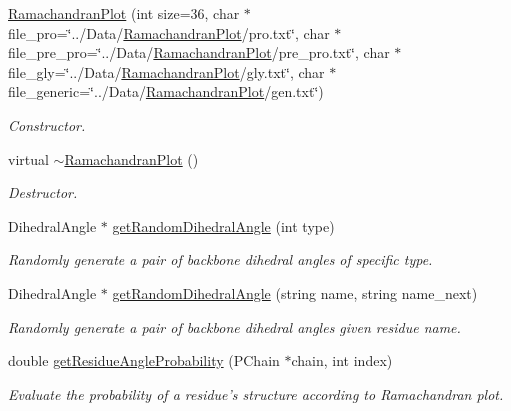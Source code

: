 \begin{DoxyCompactItemize}
\item 
\hyperlink{classRamachandranPlot_ab1c3ad4e59732c7b8800c7ebc616e125}{Ramachandran\-Plot} (int size=36, char $\ast$file\-\_\-pro=\char`\"{}../Data/\hyperlink{classRamachandranPlot}{Ramachandran\-Plot}/pro.\-txt\char`\"{}, char $\ast$file\-\_\-pre\-\_\-pro=\char`\"{}../Data/\hyperlink{classRamachandranPlot}{Ramachandran\-Plot}/pre\-\_\-pro.\-txt\char`\"{}, char $\ast$file\-\_\-gly=\char`\"{}../Data/\hyperlink{classRamachandranPlot}{Ramachandran\-Plot}/gly.\-txt\char`\"{}, char $\ast$file\-\_\-generic=\char`\"{}../Data/\hyperlink{classRamachandranPlot}{Ramachandran\-Plot}/gen.\-txt\char`\"{})
\begin{DoxyCompactList}\small\item\em Constructor. \end{DoxyCompactList}\item 
\hypertarget{classRamachandranPlot_a5f80329f5340a22a5c862dee94a81d42}{virtual \hyperlink{classRamachandranPlot_a5f80329f5340a22a5c862dee94a81d42}{$\sim$\-Ramachandran\-Plot} ()}\label{classRamachandranPlot_a5f80329f5340a22a5c862dee94a81d42}

\begin{DoxyCompactList}\small\item\em Destructor. \end{DoxyCompactList}\item 
Dihedral\-Angle $\ast$ \hyperlink{classRamachandranPlot_a73249700e3ac5ff556de348eb46224bc}{get\-Random\-Dihedral\-Angle} (int type)
\begin{DoxyCompactList}\small\item\em Randomly generate a pair of backbone dihedral angles of specific type. \end{DoxyCompactList}\item 
Dihedral\-Angle $\ast$ \hyperlink{classRamachandranPlot_a389830f21dbca4084c854f797718a922}{get\-Random\-Dihedral\-Angle} (string name, string name\-\_\-next)
\begin{DoxyCompactList}\small\item\em Randomly generate a pair of backbone dihedral angles given residue name. \end{DoxyCompactList}\item 
double \hyperlink{classRamachandranPlot_a37be1f0f5adbbf0bc00ba678a910d365}{get\-Residue\-Angle\-Probability} (P\-Chain $\ast$chain, int index)
\begin{DoxyCompactList}\small\item\em Evaluate the probability of a residue's structure according to Ramachandran plot. \end{DoxyCompactList}\end{DoxyCompactItemize}
